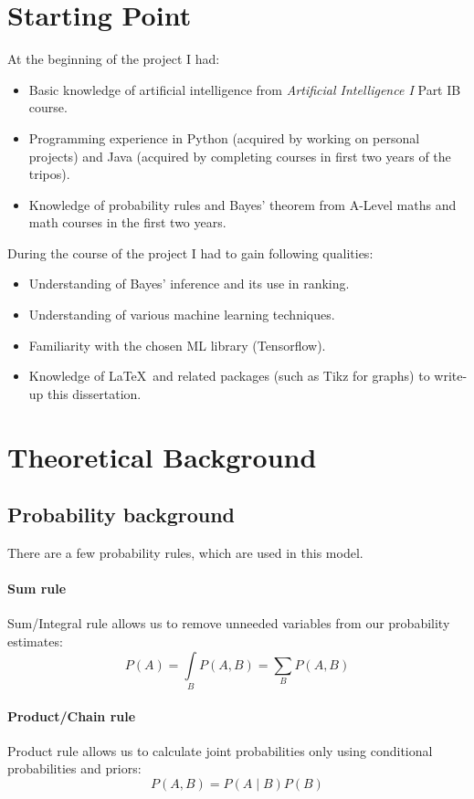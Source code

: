 \documentclass[12pt,a4paper]{book}
\begin{document}
\section{Starting Point}
\noindent
At the beginning of the project I had:
\begin{itemize}
\item Basic knowledge of artificial intelligence from \emph{Artificial Intelligence I} Part IB course.
\item Programming experience in Python (acquired by working on personal projects) and Java (acquired by completing courses in first two years of the tripos).
\item Knowledge of probability rules and Bayes' theorem from A-Level maths and math courses in the first two years.
\end{itemize}
During the course of the project I had to gain following qualities:
\begin{itemize}
\item Understanding of Bayes' inference and its use in ranking.
\item Understanding of various machine learning techniques.
\item Familiarity with the chosen ML library (Tensorflow).
\item Knowledge of \LaTeX\ and related packages (such as Tikz for graphs) to write-up this dissertation.
\end{itemize}
\section{Theoretical Background}
\subsection{Probability background}
There are a few probability rules, which are used in this model.
\paragraph{Sum rule}
Sum/Integral rule allows us to remove unneeded variables from our probability estimates:
\begin{equation*}
P(A) = \int\limits_{B}P(A,B) = \sum\limits_{B}P(A,B)
\end{equation*}
\paragraph{Product/Chain rule}
Product rule allows us to calculate joint probabilities only using conditional probabilities and priors:
\begin{equation*}
P(A,B) = P(A\mid B)P(B)
\end{equation*} 
\end{document}
